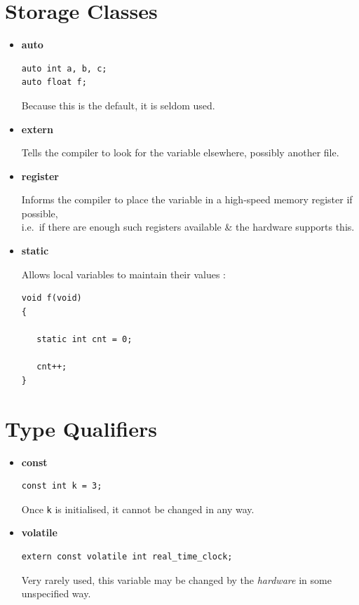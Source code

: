\documentclass[a4,portraitt]{slides}
\begin{document}
\section*{Storage Classes}
\begin{itemize}
\item {\bf auto}
\begin{verbatim}
auto int a, b, c;
auto float f;
\end{verbatim}
Because this is the default, it is seldom used.

\item {\bf extern}

Tells the compiler to look for the variable elsewhere,
possibly another file.

\item {\bf register}

Informs the compiler to place the variable in a high-speed
memory register if possible,\\ i.e.\ if there are enough such
registers available \& the hardware supports this.

\item {\bf static}

Allows local variables to maintain their values :
\begin{verbatim}
void f(void)
{

   static int cnt = 0;

   cnt++;
}
\end{verbatim}
\end{itemize}

\newpage
\section*{Type Qualifiers}

\begin{itemize}
\item {\bf const}
\begin{verbatim}
const int k = 3;
\end{verbatim}
Once \verb^k^ is initialised, it cannot be changed in any way.

\item {\bf volatile}
{\small
\begin{verbatim}
extern const volatile int real_time_clock;
\end{verbatim}
}
Very rarely used, this variable may be changed by the {\it hardware}
in some unspecified way.
\end{itemize}
\end{document}

